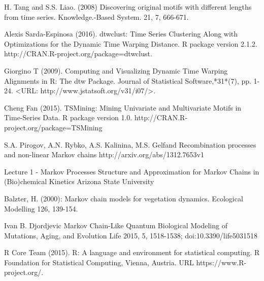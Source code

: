 \begin{thebibliography}{00}
 H. Tang and S.S. Liao. (2008)
\newblock Discovering original motifs with different lengths from time series. 
\newblock Knowledge.-Based System. 21, 7, 666-671. 

 Alexis Sarda-Espinosa (2016). 
\newblock dtwclust: Time Series Clustering Along with Optimizations for the Dynamic Time Warping Distance. 
R package version 2.1.2. http://CRAN.R-project.org/package=dtwclust.

  Giorgino T (2009). 
\newblock Computing and Visualizing Dynamic Time Warping Alignments in R: The dtw Package.
\newblock Journal of Statistical Software,*31*(7), pp. 1-24. <URL: http://www.jstatsoft.org/v31/i07/>.

 Cheng Fan (2015). 
\newblock TSMining: Mining Univariate and Multivariate Motifs in Time-Series Data. R package version 1.0.
\newblock http://CRAN.R-project.org/package=TSMining

S.A. Pirogov, A.N. Rybko, A.S. Kalinina, M.S. Gelfand
\newblock Recombination processes and non-linear Markov chains
\newblock http://arxiv.org/abs/1312.7653v1

Lecture 1 - Markov Processes
\newblock Structure  and  Approximation  for  Markov  Chains in  (Bio)chemical  Kinetics
\newblock Arizona State University

Balzter, H. (2000): 
\newblock Markov chain models for vegetation dynamics. 
\newblock Ecological Modelling 126, 139-154.

Ivan B. Djordjevic
\newblock Markov Chain-Like Quantum Biological Modeling of Mutations, Aging, and Evolution 
\newblock Life 2015, 5, 1518-1538; doi:10.3390/life5031518 

R Core Team (2015). 
\newblock R: A language and environment for statistical computing. R Foundation for Statistical Computing, Vienna, Austria.
\newblock URL https://www.R-project.org/.
\end{thebibliography}

